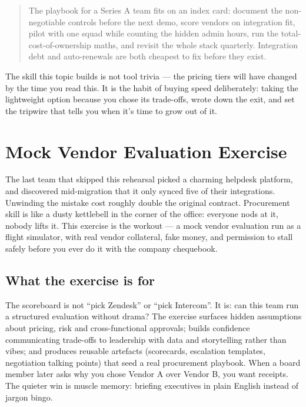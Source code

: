 \begin{quote}\small
The playbook for a Series A team fits on an index card: document the non-negotiable controls before the next demo, score vendors on integration fit, pilot with one squad while counting the hidden admin hours, run the total-cost-of-ownership maths, and revisit the whole stack quarterly. Integration debt and auto-renewals are both cheapest to fix before they exist.
\end{quote}


The skill this topic builds is not tool trivia — the pricing tiers will have changed by the time you read this. It is the habit of buying speed deliberately: taking the lightweight option because you chose its trade-offs, wrote down the exit, and set the tripwire that tells you when it's time to grow out of it.

\section{Mock Vendor Evaluation Exercise}
The last team that skipped this rehearsal picked a charming helpdesk platform, and discovered mid-migration that it only synced five of their integrations. Unwinding the mistake cost roughly double the original contract. Procurement skill is like a dusty kettlebell in the corner of the office: everyone nods at it, nobody lifts it. This exercise is the workout — a mock vendor evaluation run as a flight simulator, with real vendor collateral, fake money, and permission to stall safely before you ever do it with the company chequebook.



\subsection{What the exercise is for}


The scoreboard is not ``pick Zendesk'' or ``pick Intercom''. It is: can this team run a structured evaluation without drama? The exercise surfaces hidden assumptions about pricing, risk and cross-functional approvals; builds confidence communicating trade-offs to leadership with data and storytelling rather than vibes; and produces reusable artefacts (scorecards, escalation templates, negotiation talking points) that seed a real procurement playbook. When a board member later asks why you chose Vendor A over Vendor B, you want receipts. The quieter win is muscle memory: briefing executives in plain English instead of jargon bingo.



